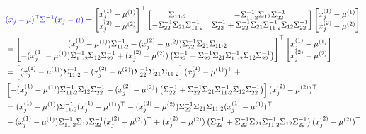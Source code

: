 \documentclass{article} %
\begin{document}
    \[
        \begin{aligned}
            &\textcolor{blue}{(x_j-\mu)^\top \Sigma^{-1} (x_j-\mu)} =
            \begin{bmatrix} x_j^{(1)}-\mu^{(1)} \\ x_j^{(2)}-\mu^{(2)} \end{bmatrix}^\top
            \begin{bmatrix}
                \Sigma_{11\cdot 2} & -\Sigma_{11\cdot 2}^{-1}\Sigma_{12}\Sigma_{22}^{-1}\\
                -\Sigma_{22}^{-1}\Sigma_{21}\Sigma_{11\cdot 2}^{-1} & \Sigma_{22}^{-1}+\Sigma_{22}^{-1}\Sigma_{21}\Sigma_{11\cdot 2}^{-1}\Sigma_{12}\Sigma_{22}^{-1}
            \end{bmatrix}
            \begin{bmatrix} x_j^{(1)}-\mu^{(1)} \\ x_j^{(2)}-\mu^{(2)} \end{bmatrix}\\
            &= \begin{bmatrix}
                (x_j^{(1)}-\mu^{(1)}) \Sigma_{11\cdot 2}^{-1} - (x_j^{(2)}-\mu^{(2)}) \Sigma_{22}^{-1}\Sigma_{21} \Sigma_{11\cdot 2}\\
                -(x_j^{(1)}-\mu^{(1)}) \Sigma_{11\cdot 2}^{-1} \Sigma_{12} \Sigma_{22}^{-1} + (x_j^{(2)}-\mu^{(2)}) \left( \Sigma_{22}^{-1} + \Sigma_{22}^{-1}\Sigma_{21}\Sigma_{11\cdot 2}^{-1}\Sigma_{12}\Sigma_{22}^{-1} \right)
            \end{bmatrix}^\top
            \begin{bmatrix} x_j^{(1)}-\mu^{(1)} \\ x_j^{(2)}-\mu^{(2)} \end{bmatrix}\\
            &= \left[ (x_j^{(1)}-\mu^{(1)}) \Sigma_{11\cdot 2}^{-1} - (x_j^{(2)}-\mu^{(2)}) \Sigma_{22}^{-1}\Sigma_{21} \Sigma_{11\cdot 2} \right] (x_j^{(1)}-\mu^{(1)})^\top \, +\\
            &\left[- (x_j^{(1)}-\mu^{(1)}) \Sigma_{11\cdot 2}^{-1} \Sigma_{12} \Sigma_{22}^{-1} - (x_j^{(2)}-\mu^{(2)}) \left( \Sigma_{22}^{-1} + \Sigma_{22}^{-1}\Sigma_{21}\Sigma_{11\cdot 2}^{-1}\Sigma_{12}\Sigma_{22}^{-1} \right) \right] (x_j^{(2)}-\mu^{(2)})^\top\\
            &= (x_j^{(1)}-\mu^{(1)}) \Sigma_{11\cdot 2}^{-1} (x_j^{(1)}-\mu^{(1)})^\top - (x_j^{(2)}-\mu^{(2)}) \Sigma_{22}^{-1}\Sigma_{21} \Sigma_{11\cdot 2} (x_j^{(1)}-\mu^{(1)})^\top\\
            &- (x_j^{(1)}-\mu^{(1)}) \Sigma_{11\cdot 2}^{-1} \Sigma_{12} \Sigma_{22}^{-1} (x_j^{(2)}-\mu^{(2)})^\top 
            + (x_j^{(2)}-\mu^{(2)}) \left( \Sigma_{22}^{-1} + \Sigma_{22}^{-1}\Sigma_{21}\Sigma_{11\cdot 2}^{-1}\Sigma_{12}\Sigma_{22}^{-1} \right) (x_j^{(2)}-\mu^{(2)})^\top\\
        \end{aligned}
    \]
\end{document}
